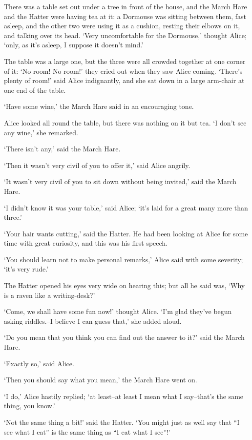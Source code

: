 \documentclass[statementpaper,twoside,openany]{memoir}
\begin{document}
There was a table set out under a tree in front of the house, and the March Hare and the Hatter were having tea at it: a Dormouse was sitting between them, fast asleep, and the other two were using it as a cushion, resting their elbows on it, and talking over its head. `Very uncomfortable for the Dormouse,' thought Alice; `only, as it's asleep, I suppose it doesn't mind.'

The table was a large one, but the three were all crowded together at one corner of it: `No room! No room!' they cried out when they saw Alice coming. `There's plenty of room!' said Alice indignantly, and she sat down in a large arm-chair at one end of the table.

`Have some wine,' the March Hare said in an encouraging tone.

Alice looked all round the table, but there was nothing on it but tea. `I don't see any wine,' she remarked.

`There isn't any,' said the March Hare.

`Then it wasn't very civil of you to offer it,' said Alice angrily.

`It wasn't very civil of you to sit down without being invited,' said the March Hare.

`I didn't know it was your table,' said Alice; `it's laid for a great many more than three.'

`Your hair wants cutting,' said the Hatter. He had been looking at Alice for some time with great curiosity, and this was his first speech.

`You should learn not to make personal remarks,' Alice said with some severity; `it's very rude.'

The Hatter opened his eyes very wide on hearing this; but all he said was, `Why is a raven like a writing-desk?'

`Come, we shall have some fun now!' thought Alice. `I'm glad they've begun asking riddles.--I believe I can guess that,' she added aloud.

`Do you mean that you think you can find out the answer to it?' said the March Hare.

`Exactly so,' said Alice.

`Then you should say what you mean,' the March Hare went on.

`I do,' Alice hastily replied; `at least--at least I mean what I say--that's the same thing, you know.'

`Not the same thing a bit!' said the Hatter. `You might just as well say that ``I see what I eat'' is the same thing as ``I eat what I see''!'
\end{document}
